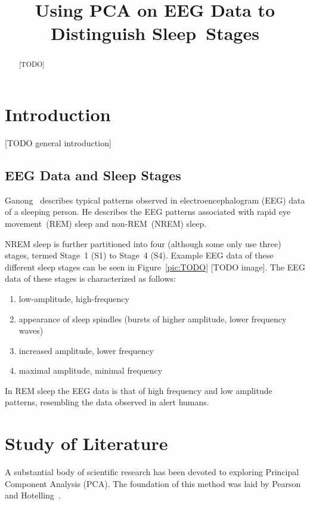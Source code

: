 \documentclass[a4paper]{IEEEtran}
\title{Using PCA on EEG Data to Distinguish Sleep~Stages}
\author{\IEEEauthorblockN{Ida Hönigmann}
	\IEEEauthorblockA{\\Technische Universität Wien, Austria\\
		Email: e12002348@student.tuwien.ac.at}}
\begin{document}
\maketitle

\begin{abstract}
[TODO]
\end{abstract}

\section{Introduction}
\label{sec:introduction}

[TODO general introduction]

\subsection{EEG Data and Sleep Stages}

Ganong~\cite{Ganong1997} describes typical patterns observed in electroencephalogram (EEG) data of a sleeping person. He describes the EEG patterns associated with rapid eye movement~(REM) sleep and non-REM~(NREM) sleep.

NREM sleep is further partitioned into four (although some only use three) stages, termed Stage~1 (S1) to Stage~4 (S4). Example EEG data of these different sleep stages can be seen in Figure~\ref{pic:TODO} [TODO image]. The EEG data of these stages is characterized as follows:

\begin{enumerate}[label={S\arabic*:}]
\item low-amplitude, high-frequency
\item appearance of sleep spindles (bursts of higher amplitude, lower frequency waves)
\item increased amplitude, lower frequency
\item maximal amplitude, minimal frequency
\end{enumerate}

In REM sleep the EEG data is that of high frequency and low amplitude patterns, resembling the data observed in alert humans.

\section{Study of Literature}
\label{sec:study_of_literature}

A substantial body of scientific research has been devoted to exploring Principal Component Analysis (PCA).
The foundation of this method was laid by Pearson~\cite{Pearson1901} and Hotelling~\cite{Hotelling1933}.
\end{document}
